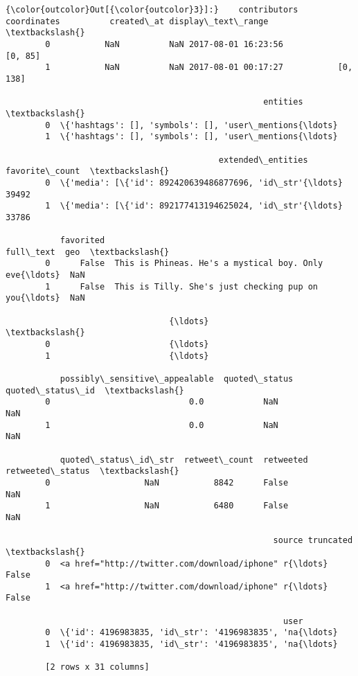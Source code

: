\documentclass[11pt]{article}
\begin{document}
\begin{Verbatim}[commandchars=\\\{\}]
{\color{outcolor}Out[{\color{outcolor}3}]:}    contributors  coordinates          created\_at display\_text\_range  \textbackslash{}
        0           NaN          NaN 2017-08-01 16:23:56            [0, 85]   
        1           NaN          NaN 2017-08-01 00:17:27           [0, 138]   
        
                                                    entities  \textbackslash{}
        0  \{'hashtags': [], 'symbols': [], 'user\_mentions{\ldots}   
        1  \{'hashtags': [], 'symbols': [], 'user\_mentions{\ldots}   
        
                                           extended\_entities  favorite\_count  \textbackslash{}
        0  \{'media': [\{'id': 892420639486877696, 'id\_str'{\ldots}           39492   
        1  \{'media': [\{'id': 892177413194625024, 'id\_str'{\ldots}           33786   
        
           favorited                                          full\_text  geo  \textbackslash{}
        0      False  This is Phineas. He's a mystical boy. Only eve{\ldots}  NaN   
        1      False  This is Tilly. She's just checking pup on you{\ldots}  NaN   
        
                                 {\ldots}                          \textbackslash{}
        0                        {\ldots}                           
        1                        {\ldots}                           
        
           possibly\_sensitive\_appealable  quoted\_status quoted\_status\_id  \textbackslash{}
        0                            0.0            NaN              NaN   
        1                            0.0            NaN              NaN   
        
           quoted\_status\_id\_str  retweet\_count  retweeted  retweeted\_status  \textbackslash{}
        0                   NaN           8842      False               NaN   
        1                   NaN           6480      False               NaN   
        
                                                      source truncated  \textbackslash{}
        0  <a href="http://twitter.com/download/iphone" r{\ldots}     False   
        1  <a href="http://twitter.com/download/iphone" r{\ldots}     False   
        
                                                        user  
        0  \{'id': 4196983835, 'id\_str': '4196983835', 'na{\ldots}  
        1  \{'id': 4196983835, 'id\_str': '4196983835', 'na{\ldots}  
        
        [2 rows x 31 columns]
\end{Verbatim}
            
\end{document}
